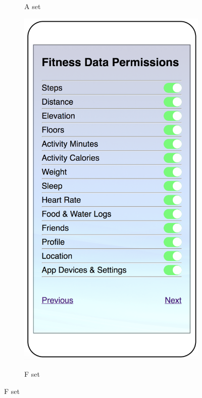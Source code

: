 \begin{figure}
\begin{subfigure}[b]{0.24\textheight}
		\label{fig:defaulta}
		\caption{A set}
	\end{subfigure}
	\begin{subfigure}[b]{0.24\textheight}
		\includegraphics[width=0.24\textheight]{figures/default2.png}
		\label{fig:defaultb}
		\caption{F set}
	\end{subfigure}

\end{figure}
